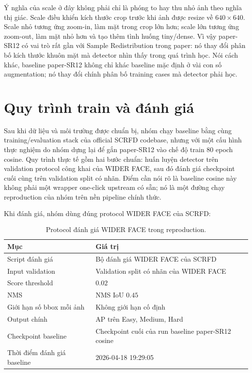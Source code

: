Ý nghĩa của scale ở đây không phải chỉ là phóng to hay thu nhỏ ảnh theo nghĩa thị giác. Scale điều khiển kích thước crop trước khi ảnh được resize về \(640\times640\). Scale nhỏ tương ứng zoom-in, làm mặt trong crop lớn hơn; scale lớn tương ứng zoom-out, làm mặt nhỏ hơn và tạo thêm tình huống tiny/dense. Vì vậy paper-SR12 có vai trò rất gần với Sample Redistribution trong paper: nó thay đổi phân bố kích thước khuôn mặt mà detector nhìn thấy trong quá trình học. Nói cách khác, baseline paper-SR12 không chỉ khác baseline mặc định ở vài con số augmentation; nó thay đổi chính phân bố training cases mà detector phải học.

\section{Quy trình train và đánh giá}

Sau khi dữ liệu và môi trường được chuẩn bị, nhóm chạy baseline bằng cùng training/evaluation stack của official SCRFD codebase, nhưng với một cấu hình thực nghiệm do nhóm dựng lại để gắn paper-SR12 vào chế độ train 80 epoch cosine. Quy trình thực tế gồm hai bước chuẩn: huấn luyện detector trên validation protocol công khai của WIDER FACE, sau đó đánh giá checkpoint cuối cùng trên validation split có nhãn. Điểm cần nói rõ là baseline cosine này không phải một wrapper one-click upstream có sẵn; nó là một đường chạy reproduction của nhóm trên nền pipeline chính thức.

Khi đánh giá, nhóm dùng đúng protocol WIDER FACE của SCRFD:

\begin{table}[H]
\centering
\caption{Protocol đánh giá WIDER FACE trong reproduction.}
\small
\begin{tabular}{@{}p{}p{}@{}}
\toprule
\textbf{Mục} & \textbf{Giá trị} \\
\midrule
Script đánh giá & Bộ đánh giá WIDER FACE của SCRFD \\
\midrule
Input validation & Validation split có nhãn của WIDER FACE \\
\midrule
Score threshold & \(0.02\) \\
\midrule
NMS & NMS IoU \(0.45\) \\
\midrule
Giới hạn số bbox mỗi ảnh & Không giới hạn cố định \\
\midrule
Output chính & AP trên Easy, Medium, Hard \\
\midrule
Checkpoint baseline & Checkpoint cuối của run baseline paper-SR12 cosine \\
\midrule
Thời điểm đánh giá baseline & 2026-04-18 19:29:05 \\
\bottomrule
\end{tabular}
\end{table}

